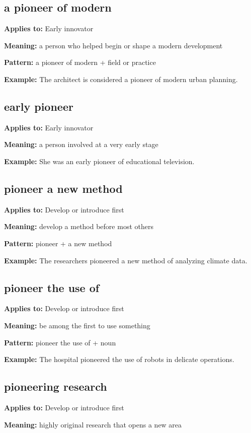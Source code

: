 \documentclass[11pt]{article}
\begin{document}
\subsection{a pioneer of modern}
\textbf{Applies to:} Early innovator

\textbf{Meaning:} a person who helped begin or shape a modern development

\textbf{Pattern:} a pioneer of modern + field or practice

\textbf{Example:} The architect is considered a pioneer of modern urban planning.

\subsection{early pioneer}
\textbf{Applies to:} Early innovator

\textbf{Meaning:} a person involved at a very early stage

\textbf{Example:} She was an early pioneer of educational television.

\subsection{pioneer a new method}
\textbf{Applies to:} Develop or introduce first

\textbf{Meaning:} develop a method before most others

\textbf{Pattern:} pioneer + a new method

\textbf{Example:} The researchers pioneered a new method of analyzing climate data.

\subsection{pioneer the use of}
\textbf{Applies to:} Develop or introduce first

\textbf{Meaning:} be among the first to use something

\textbf{Pattern:} pioneer the use of + noun

\textbf{Example:} The hospital pioneered the use of robots in delicate operations.

\subsection{pioneering research}
\textbf{Applies to:} Develop or introduce first

\textbf{Meaning:} highly original research that opens a new area
\end{document}
